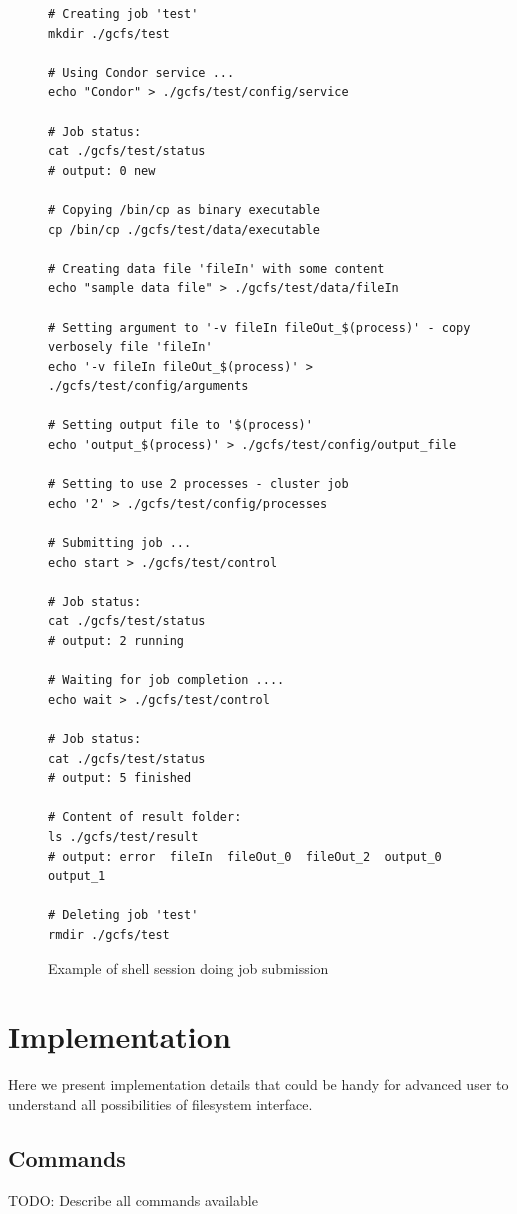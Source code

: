 \documentclass[a4paper,10pt,twocolumn]{article}
\begin{document}
\begin{figure}
  \begin{verbatim}
# Creating job 'test'
mkdir ./gcfs/test

# Using Condor service ...
echo "Condor" > ./gcfs/test/config/service

# Job status:
cat ./gcfs/test/status
# output: 0	new

# Copying /bin/cp as binary executable
cp /bin/cp ./gcfs/test/data/executable

# Creating data file 'fileIn' with some content
echo "sample data file" > ./gcfs/test/data/fileIn

# Setting argument to '-v fileIn fileOut_$(process)' - copy verbosely file 'fileIn'
echo '-v fileIn fileOut_$(process)' > ./gcfs/test/config/arguments

# Setting output file to '$(process)'
echo 'output_$(process)' > ./gcfs/test/config/output_file

# Setting to use 2 processes - cluster job
echo '2' > ./gcfs/test/config/processes

# Submitting job ...
echo start > ./gcfs/test/control

# Job status:
cat ./gcfs/test/status
# output: 2	running

# Waiting for job completion ....
echo wait > ./gcfs/test/control

# Job status:
cat ./gcfs/test/status
# output: 5	finished

# Content of result folder:
ls ./gcfs/test/result
# output: error  fileIn  fileOut_0  fileOut_2  output_0  output_1

# Deleting job 'test'
rmdir ./gcfs/test
  \end{verbatim}
  \caption{Example of shell session doing job submission}
  \label{example}
\end{figure}


\section{Implementation}

Here we present implementation details that could be handy for advanced user to understand all possibilities of filesystem interface.

\subsection{Commands}

TODO: Describe all commands available
\end{document}
